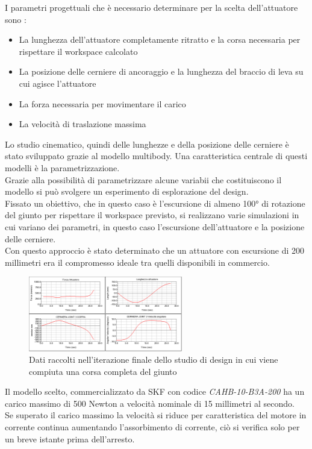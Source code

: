 \documentclass[%
corpo=11pt,
twoside,
 stile=classica,
oldstyle,
greek,%
]{toptesi}
\begin{document}
	I parametri progettuali che è necessario determinare per la scelta dell'attuatore sono :
	\begin{itemize}
		\item La lunghezza dell'attuatore completamente ritratto e la corsa necessaria per rispettare il workspace calcolato
		\item La posizione delle cerniere di ancoraggio e la lunghezza del braccio di leva su cui agisce l'attuatore
		\item La forza necessaria per movimentare il carico 
		\item La velocità di traslazione massima 
	\end{itemize}
	
	Lo studio cinematico, quindi delle lunghezze e della posizione delle cerniere è stato sviluppato grazie al modello multibody. Una caratteristica centrale di questi modelli è la parametrizzazione.\\
	 Grazie alla possibilità di parametrizzare alcune variabii che costituiscono il modello si può svolgere un esperimento di esplorazione del design. \\
	Fissato un obiettivo, che in questo caso è l'escursione di almeno 100° di rotazione del giunto per rispettare il workspace previsto, si realizzano varie simulazioni in cui variano dei parametri, in questo caso l'escursione dell'attuatore e la posizione delle cerniere. \\
	Con questo approccio è stato determinato che un attuatore con escursione di 200 millimetri era il compromesso ideale tra quelli disponibili in commercio. 
	\begin{figure}
		\centering
		\includegraphics[width=0.6\textwidth]{Plots/GOMITO/Joint3.png}
		\caption{Dati raccolti nell'iterazione finale dello studio di design in cui viene compiuta una corsa completa del giunto }
		\label{fig:MBDLinear}
	\end{figure}
	Il modello scelto, commercializzato da SKF con codice \textit{CAHB-10-B3A-200} ha un carico massimo di 500 Newton a velocità nominale di 15 millimetri al secondo. \\
	Se superato il carico massimo la velocità si riduce per caratteristica del motore in corrente continua aumentando l'assorbimento di corrente, ciò si verifica solo per un breve istante prima dell'arresto.\\
\end{document}
